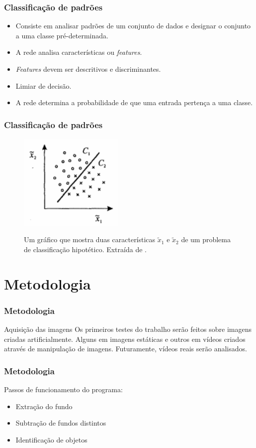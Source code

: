 \documentclass{beamer}
\begin{document}
\begin{frame}
\frametitle{Classificação de padrões}
\begin{itemize}
\item Consiste em analisar padrões de um conjunto de dados e designar o conjunto a uma classe pré-determinada.
\item A rede analisa características ou \textit{features}.
\item \textit{Features} devem ser descritivos e discriminantes.
\item Limiar de decisão.
\item A rede determina a probabilidade de que uma entrada pertença a uma classe.
\end{itemize}
\end{frame}

\begin{frame}
\frametitle{Classificação de padrões}
\begin{figure}
\centering
\includegraphics[width=5cm]{features}
\label{fig:features}
\caption{Um gráfico que mostra duas características $\tilde{x}_1$ e $\tilde{x}_2$ de um problema de classificação hipotético. Extraída de \cite{NNForPR}.}
\end{figure}
\end{frame}


\section{Metodologia}

\begin{frame}
\frametitle{Metodologia}
    \begin{block}{Aquisição das imagens}
    Os primeiros testes do trabalho serão feitos sobre imagens criadas artificialmente. Alguns em imagens estáticas e outros em vídeos criados através de manipulação de imagens. Futuramente, vídeos reais serão analisados.
    \end{block}
\end{frame}

\begin{frame}
\frametitle{Metodologia}
    Passos de funcionamento do programa:
    \begin{itemize}
        \item Extração do fundo
        \item Subtração de fundos distintos
        \item Identificação de objetos
    \end{itemize}
\end{frame}
\end{document}
